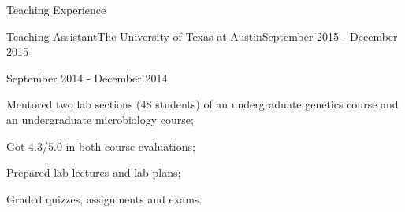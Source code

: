 \documentclass{my_resume} %
\begin{document}

\begin{rSection}{Teaching Experience}

\begin{rSubsection}{Teaching Assistant}{The University of Texas at
  Austin}{September 2015 - December 2015}
\begin{rSubsection}{}{}{September 2014 - December 2014}
\item Mentored two lab sections (48 students) of an undergraduate genetics
  course and an undergraduate microbiology course;
\item Got 4.3/5.0 in both course evaluations;
\item Prepared lab lectures and lab plans;
\item Graded quizzes, assignments and exams.
\end{rSubsection}
\end{rSubsection}
\end{rSection}
\end{document}
